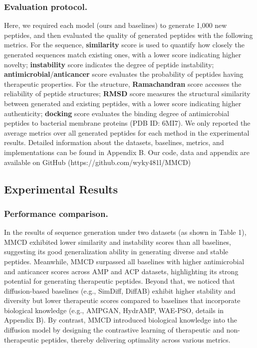 \documentclass[letterpaper]{article} %
\begin{document}
\subsubsection{Evaluation protocol.}
Here, we required each model (ours and baselines) to generate 1,000 new peptides, and then evaluated the quality of generated peptides with the following metrics. For the sequence, \textbf{similarity} score is used to quantify how closely the generated sequences match existing ones, with a lower score indicating higher novelty; \textbf{instability} score \cite{mullerModlAMPPython2017} indicates the degree of peptide instability; \textbf{antimicrobial}/\textbf{anticancer} score evaluates the probability of peptides having therapeutic properties. For the structure, \textbf{Ramachandran} score \cite{hollingsworthFreshLook2010} accesses the reliability of peptide structures; \textbf{RMSD} score measures the structural similarity between generated and existing peptides, with a lower score indicating higher authenticity; \textbf{docking} score \cite{florez-castilloIbM6Antimicrobial2020} evaluates the binding degree of antimicrobial peptides to bacterial membrane proteins (PDB ID: 6MI7). We only reported the average metrics over all generated peptides for each method in the experimental results. Detailed information about the datasets, baselines, metrics, and implementations can be found in Appendix B. Our code, data and appendix are available on GitHub (https://github.com/wyky481l/MMCD)

\subsection{Experimental Results}
\subsubsection{Performance comparison.}
In the results of sequence generation under two datasets (as shown in Table 1), MMCD exhibited lower similarity and instability scores than all baselines, suggesting its good generalization ability in generating diverse and stable peptides. Meanwhile, MMCD surpassed all baselines with higher antimicrobial and anticancer scores across AMP and ACP datasets, highlighting its strong potential for generating therapeutic peptides. Beyond that, we noticed that diffusion-based baselines (e.g., SimDiff, DiffAB) exhibit higher stability and diversity but lower therapeutic scores compared to baselines that incorporate biological knowledge (e.g., AMPGAN, HydrAMP, WAE-PSO, details in Appendix B). By contrast, MMCD introduced biological knowledge into the diffusion model by designing the contrastive learning of therapeutic and non-therapeutic peptides, thereby delivering optimality across various metrics.
\end{document}

